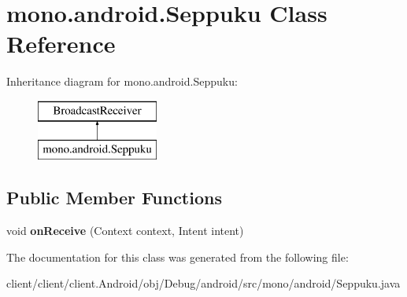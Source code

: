 \hypertarget{classmono_1_1android_1_1Seppuku}{}\section{mono.\+android.\+Seppuku Class Reference}
\label{classmono_1_1android_1_1Seppuku}
Inheritance diagram for mono.\+android.\+Seppuku\+:\begin{figure}[H]
\begin{center}
\leavevmode
\includegraphics[height=2.000000cm]{classmono_1_1android_1_1Seppuku}
\end{center}
\end{figure}
\subsection*{Public Member Functions}
\begin{DoxyCompactItemize}
\item 
\hypertarget{classmono_1_1android_1_1Seppuku_abf493c6888eae9735c6b1fd052c25a2a}{}void {\bfseries on\+Receive} (Context context, Intent intent)\label{classmono_1_1android_1_1Seppuku_abf493c6888eae9735c6b1fd052c25a2a}

\end{DoxyCompactItemize}


The documentation for this class was generated from the following file\+:\begin{DoxyCompactItemize}
\item 
client/client/client.\+Android/obj/\+Debug/android/src/mono/android/Seppuku.\+java\end{DoxyCompactItemize}
